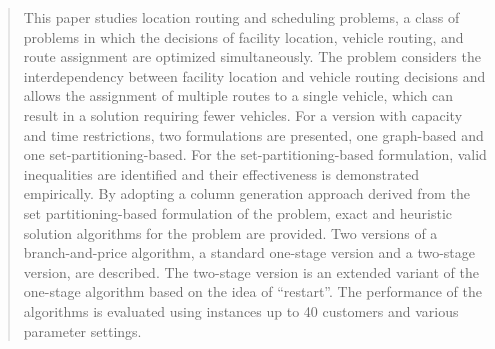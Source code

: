 \documentclass[11pt]{article}
\begin{document}




\begin{abstract}%
This paper studies location routing and scheduling problems, a class of problems
in which the decisions of facility location, vehicle routing, and route assignment
are optimized simultaneously. The problem considers the interdependency 
between facility location and vehicle routing decisions and allows the 
assignment of multiple routes to a single vehicle, which can result in a solution requiring fewer vehicles.  For a version with capacity and time restrictions,
two formulations are presented, one graph-based and one set-partitioning-based.
For the set-partitioning-based formulation, valid inequalities are identified
and their effectiveness is demonstrated empirically.  
By adopting a column generation approach derived from the set partitioning-based 
formulation of the problem, exact and heuristic solution algorithms for the 
problem are provided. Two versions of a branch-and-price algorithm, a standard
one-stage version and a two-stage version, are described. 
The two-stage version is an extended variant of the one-stage algorithm based on the 
idea of ``restart''. The performance of the algorithms
 is evaluated using instances up to 40 customers and various parameter settings.    

\end{abstract}%
\end{document}
